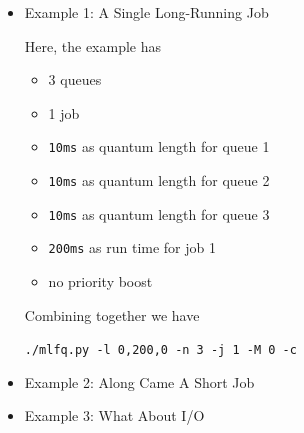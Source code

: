 \documentclass[12pt]{article}
\begin{document}
\begin{enumerate}[1.]
    \bigskip

    \begin{itemize}
        \item Example 1: A Single Long-Running Job

        \bigskip

        Here, the example has

        \begin{itemize}
            \item 3 queues
            \item 1 job
            \item \texttt{10ms} as quantum length for queue 1
            \item \texttt{10ms} as quantum length for queue 2
            \item \texttt{10ms} as quantum length for queue 3
            \item \texttt{200ms} as run time for job 1
            \item no priority boost
        \end{itemize}

        \bigskip

        Combining together we have

        \texttt{./mlfq.py -l 0,200,0 -n 3 -j 1 -M 0 -c}

        \item Example 2: Along Came A Short Job
        \item Example 3: What About I/O
    \end{itemize}


\end{enumerate}
\end{document}
